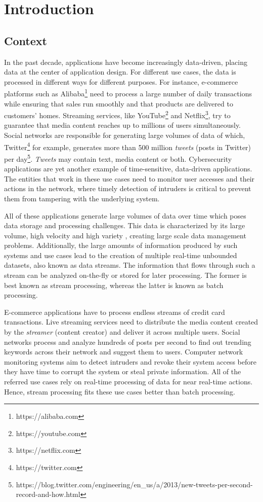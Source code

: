 \chapter{Introduction} \label{chap:intro} \minitoc

\section{Context} \label{sec:context}
In the past decade, applications have become increasingly data-driven, placing data at the center of application design. For different use cases, the data is processed in different ways for different purposes. For instance, e-commerce platforms such as Alibaba\footnote{https://alibaba.com} need to process a large number of daily transactions while ensuring that sales run smoothly and that products are delivered to customers' homes. Streaming services, like YouTube\footnote{https://youtube.com} and Netflix\footnote{https://netflix.com}, try to guarantee that media content reaches up to millions of users simultaneously. Social networks are responsible for generating large volumes of data of which,  Twitter\footnote{https://twitter.com} for example, generates more than 500 million \textit{tweets} (posts in Twitter) per day\footnote{https://blog.twitter.com/engineering/en\_us/a/2013/new-tweets-per-second-record-and-how.html}. \textit{Tweets} may contain text, media content or both. Cybersecurity applications are yet another example of time-sensitive, data-driven applications. The entities that work in these use cases need to monitor user accesses and their actions in the network, where timely detection of intruders is critical to prevent them from tampering with the underlying system.

All of these applications generate large volumes of data over time which poses data storage and processing challenges. This data is characterized by its large volume, high velocity and high variety \cite{Mavragani-GoogleTrends-SLR}, creating large scale data management problems. Additionally, the large amounts of information produced by such systems and use cases lead to the creation of multiple real-time unbounded datasets, also known as data streams. The information that flows through such a stream can be analyzed on-the-fly or stored for later processing. The former is best known as stream processing, whereas the latter is known as batch processing. 

E-commerce applications have to process endless streams of credit card transactions. Live streaming services need to distribute the media content created by the \textit{streamer} (content creator) and deliver it across multiple users. Social networks process and analyze hundreds of posts per second to find out trending keywords across their network and suggest them to users. Computer network monitoring systems aim to detect intruders and revoke their system access before they have time to corrupt the system or steal private information. All of the referred use cases rely on real-time processing of data for near real-time actions. Hence, stream processing fits these use cases better than batch processing.

